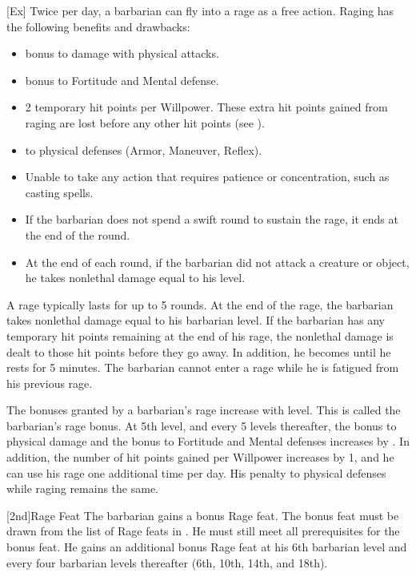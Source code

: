         [Ex]
        Twice per day, a barbarian can fly into a rage as a free action.
        Raging has the following benefits and drawbacks:
        \begin{itemize}
            \item {} bonus to damage with physical attacks.
            \item {} bonus to Fortitude and Mental defense.
            \item 2 temporary hit points per Willpower.
                These extra hit points gained from raging are lost before any other hit points (see ).
            \item {} to physical defenses (Armor, Maneuver, Reflex).
            \item Unable to take any action that requires patience or concentration, such as casting spells.
            \item If the barbarian does not spend a swift round to sustain the rage, it ends at the end of the round.
            \item At the end of each round, if the barbarian did not attack a creature or object, he takes nonlethal damage equal to his level.
        \end{itemize}

        A rage typically lasts for up to 5 rounds.
        At the end of the rage, the barbarian takes nonlethal damage equal to his barbarian level.
        If the barbarian has any temporary hit points remaining at the end of his rage, the nonlethal damage is dealt to those hit points before they go away.
        In addition, he becomes \fatigued until he rests for 5 minutes.
        The barbarian cannot enter a rage while he is fatigued from his previous rage.

        The bonuses granted by a barbarian's rage increase with level.
        This is called the barbarian's rage bonus.
        At 5th level, and every 5 levels thereafter, the bonus to physical damage and the bonus to Fortitude and Mental defenses increases by .
        In addition, the number of hit points gained per Willpower increases by 1, and he can use his rage one additional time per day.
        His penalty to physical defenses while raging remains the same.

        [2nd]{Rage Feat}
        The barbarian gains a bonus Rage feat.
        The bonus feat must be drawn from the list of Rage feats in .
        He must still meet all prerequisites for the bonus feat.
        He gains an additional bonus Rage feat at his 6th barbarian level and every four barbarian levels thereafter (6th, 10th, 14th, and 18th).

